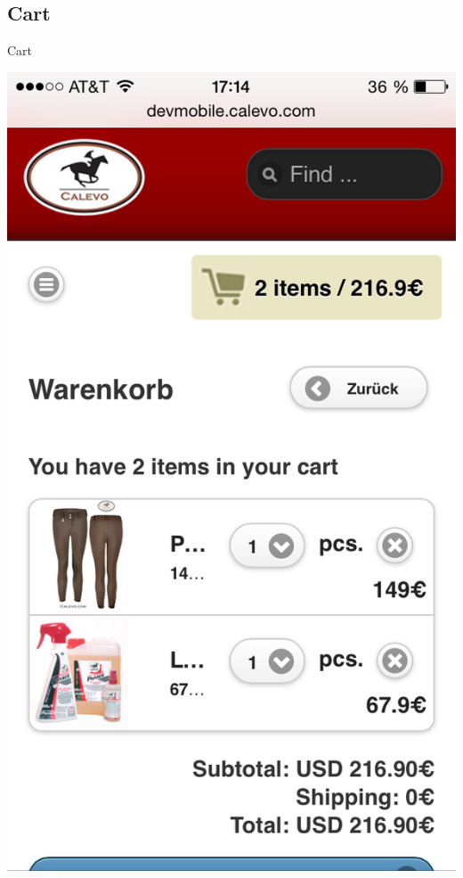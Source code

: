 \subsection{Cart}
\begin{frame}{Cart}
\begin{center}
  \includegraphics[width=\textwidth,height=1\textheight,keepaspectratio]{pics/cart.png}
\end{center}
\end{frame}

